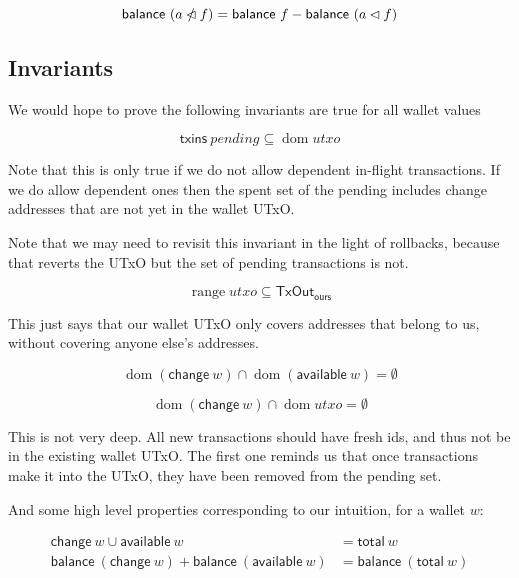 \documentclass{article}
\DeclareMathOperator{\dom}{dom}
\DeclareMathOperator{\range}{range}
\newcommand{\restrictdom}{\lhd}
\newcommand{\subtractdom}{\mathbin{\slashed{\restrictdom}}}
\begin{document}
\begin{equation} \label{lemma_balance_union}
  \mathsf{balance} ~ (a \subtractdom f) = \mathsf{balance} ~ f - \mathsf{balance} ~ (a \restrictdom f) \\
\end{equation}


\subsection{Invariants}
\label{sec:invariants}

We would hope to prove the following invariants are true for all wallet values

\begin{equation} \label{txins_in_dom_utxo}
\mathsf{txins} ~ pending \subseteq \dom utxo
\end{equation}

Note that this is only true if we do not allow dependent in-flight transactions.
If we do allow dependent ones then the spent set of the pending includes change
addresses that are not yet in the wallet UTxO.

Note that we may need to revisit this invariant in the light of rollbacks,
because that reverts the UTxO but the set of pending transactions is not.

\begin{equation}
\range utxo \subseteq \mathsf{TxOut_{ours}}
\end{equation}

This just says that our wallet UTxO only covers addresses that belong to us,
without covering anyone else's addresses.

\begin{equation} \label{change_vs_available}
\dom (\mathsf{change} ~ w) \cap \dom (\mathsf{available} ~ w) = \emptyset
\end{equation}

\begin{equation} \label{change_vs_utxo}
\dom (\mathsf{change} ~ w) \cap \dom utxo = \emptyset
\end{equation}

This is not very deep. All new transactions should have fresh ids, and thus
not be in the existing wallet UTxO. The first one reminds us that once
transactions make it into the UTxO, they have been removed from the pending set.

And some high level properties corresponding to our intuition, for a wallet $w$:

\begin{equation}
\begin{split}
\mathsf{change} ~ w \cup \mathsf{available} ~ w &= \mathsf{total} ~ w \\
\mathsf{balance} ~ (\mathsf{change} ~ w) + \mathsf{balance} ~ (\mathsf{available} ~ w) &= \mathsf{balance} ~ (\mathsf{total} ~ w)
\end{split}
\end{equation}
\end{document}
